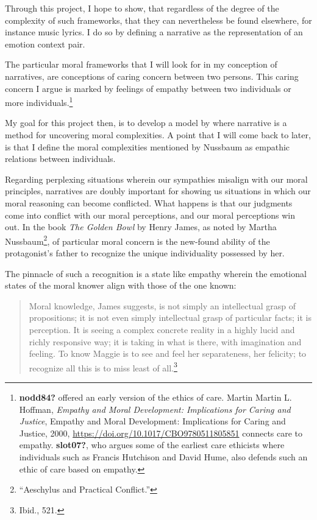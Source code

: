 \documentclass[
  12pt,
]{book}
\theoremstyle{definition}
\theoremstyle{definition}
\theoremstyle{definition}
\theoremstyle{definition}
\theoremstyle{remark}
\begin{document}
Through this project, I hope to show, that regardless of the degree of the complexity of such frameworks, that they can nevertheless be found elsewhere, for instance music lyrics. I do so by defining a narrative as the representation of an emotion context pair.

The particular moral frameworks that I will look for in my conception of narratives, are conceptions of caring concern between two persons. This caring concern I argue is marked by feelings of empathy between two individuals or more individuals.\footnote{\textbf{nodd84?} offered an early version of the ethics of care. Martin Martin L. Hoffman, \emph{Empathy and Moral Development: {Implications} for Caring and Justice}, Empathy and Moral Development: {Implications} for Caring and Justice, 2000, \url{https://doi.org/10.1017/CBO9780511805851} connects care to empathy. \textbf{slot07?}, who argues some of the earliest care ethicists where individuals such as Francis Hutchison and David Hume, also defends such an ethic of care based on empathy.}

My goal for this project then, is to develop a model by where narrative is a method for uncovering moral complexities. A point that I will come back to later, is that I define the moral complexities mentioned by Nussbaum as empathic relations between individuals.

Regarding perplexing situations wherein our sympathies misalign with our moral principles, narratives are doubly important for showing us situations in which our moral reasoning can become conflicted. What happens is that our judgments come into conflict with our moral perceptions, and our moral perceptions win out. In the book \emph{The Golden Bowl} by Henry James, as noted by Martha Nussbaum\footnote{{``Aeschylus and Practical Conflict.''}}, of particular moral concern is the new-found ability of the protagonist's father to recognize the unique individuality possessed by her.

The pinnacle of such a recognition is a state like empathy wherein the emotional states of the moral knower align with those of the one known:

\begin{quote}
Moral knowledge, James suggests, is not simply an intellectual grasp of propositions; it is not even simply intellectual grasp of particular facts; it is perception. It is seeing a complex concrete reality in a highly lucid and richly responsive way; it is taking in what is there, with imagination and feeling. To know Maggie is to see and feel her separateness, her felicity; to recognize all this is to miss least of all.\footnote{Ibid., 521.}
\end{quote}
\end{document}
